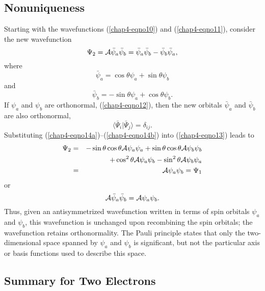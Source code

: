 \subsection{Nonuniqueness}

Starting with the wavefunctions (\ref{chap4-eqno10}) and
(\ref{chap4-eqno11}), consider the new wavefunction
\begin{equation}
\Psi_2 = {\cal A} \bar{\psi}_a \bar{\psi}_b  
  = \bar{\psi}_a \bar{\psi}_b - \bar{\psi}_b \bar{\psi}_a, 
\label{chap4-eqno13}
\end{equation}
where
\begin{equation}
\bar{\psi}_a = \cos \theta \psi_a + \sin \theta \psi_b
\label{chap4-eqno14a}
\end{equation}
and
\begin{equation}
\bar{\psi}_b = - \sin \theta \psi_a + \cos \theta \psi_b .
\label{chap4-eqno14b}
\end{equation}
If $\psi_a$ and $\psi_b$ are orthonormal, (\ref{chap4-eqno12}), then
the new orbitals $\bar{\psi}_a$ and $\bar{\psi}_b$ are also
orthonormal,
\begin{equation}
\langle \bar{\Psi}_i \vert \bar{\Psi}_j \rangle = \delta_{ij} .
\end{equation}
Substituting (\ref{chap4-eqno14a})--(\ref{chap4-eqno14b}) into
(\ref{chap4-eqno13}) leads to
\begin{eqnarray}
\Psi_2 &=& -\sin\theta\cos\theta {\cal A} \psi_a \psi_a 
   + \sin\theta\cos\theta {\cal A} \psi_b \psi_b \\
  &&+ \cos^2 \theta {\cal A} \psi_a\psi_b - \sin^2 \theta {\cal A}
   \psi_b \psi_a \\
  &=& {\cal A} \psi_a\psi_b = \Psi_1
\end{eqnarray}
or
\begin{equation}
{\cal A} \bar{\psi}_a \bar{\psi}_b = {\cal A} \psi_a \psi_b .
\end{equation}
Thus, given an antisymmetrized wavefunction written in terms of spin
orbitals $\psi_a$ and $\psi_b$, this wavefunction is unchanged upon
recombining the spin orbitals; the wavefunction retains
orthonormality.  The Pauli principle states that only the
two-dimensional space spanned by $\psi_a$ and $\psi_b$ is significant,
but not the particular axis or basis functions used to describe this
space.

\subsection{Summary for Two Electrons}

